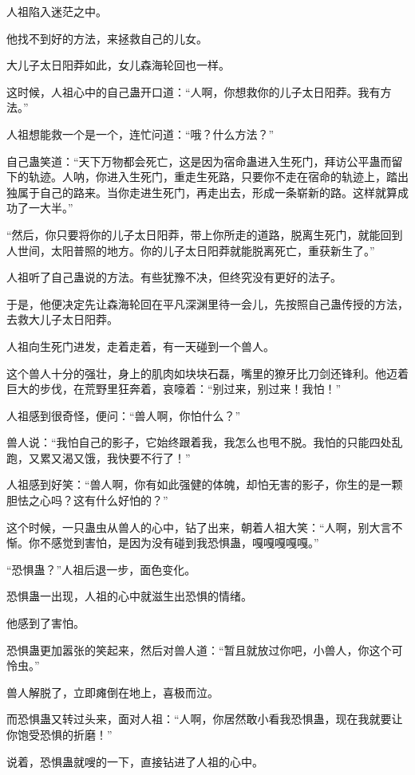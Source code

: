 \begin{this_body}
人祖陷入迷茫之中。

他找不到好的方法，来拯救自己的儿女。

大儿子太日阳莽如此，女儿森海轮回也一样。

这时候，人祖心中的自己蛊开口道：“人啊，你想救你的儿子太日阳莽。我有方法。”

人祖想能救一个是一个，连忙问道：“哦？什么方法？”

自己蛊笑道：“天下万物都会死亡，这是因为宿命蛊进入生死门，拜访公平蛊而留下的轨迹。人呐，你进入生死门，重走生死路，只要你不走在宿命的轨迹上，踏出独属于自己的路来。当你走进生死门，再走出去，形成一条崭新的路。这样就算成功了一大半。”

“然后，你只要将你的儿子太日阳莽，带上你所走的道路，脱离生死门，就能回到人世间，太阳普照的地方。你的儿子太日阳莽就能脱离死亡，重获新生了。”

人祖听了自己蛊说的方法。有些犹豫不决，但终究没有更好的法子。

于是，他便决定先让森海轮回在平凡深渊里待一会儿，先按照自己蛊传授的方法，去救大儿子太日阳莽。

人祖向生死门进发，走着走着，有一天碰到一个兽人。

这个兽人十分的强壮，身上的肌肉如块块石磊，嘴里的獠牙比刀剑还锋利。他迈着巨大的步伐，在荒野里狂奔着，哀嚎着：“别过来，别过来！我怕！”

人祖感到很奇怪，便问：“兽人啊，你怕什么？”

兽人说：“我怕自己的影子，它始终跟着我，我怎么也甩不脱。我怕的只能四处乱跑，又累又渴又饿，我快要不行了！”

人祖感到好笑：“兽人啊，你有如此强健的体魄，却怕无害的影子，你生的是一颗胆怯之心吗？这有什么好怕的？”

这个时候，一只蛊虫从兽人的心中，钻了出来，朝着人祖大笑：“人啊，别大言不惭。你不感觉到害怕，是因为没有碰到我恐惧蛊，嘎嘎嘎嘎嘎。”

“恐惧蛊？”人祖后退一步，面色变化。

恐惧蛊一出现，人祖的心中就滋生出恐惧的情绪。

他感到了害怕。

恐惧蛊更加嚣张的笑起来，然后对兽人道：“暂且就放过你吧，小兽人，你这个可怜虫。”

兽人解脱了，立即瘫倒在地上，喜极而泣。

而恐惧蛊又转过头来，面对人祖：“人啊，你居然敢小看我恐惧蛊，现在我就要让你饱受恐惧的折磨！”

说着，恐惧蛊就嗖的一下，直接钻进了人祖的心中。


\end{this_body}
